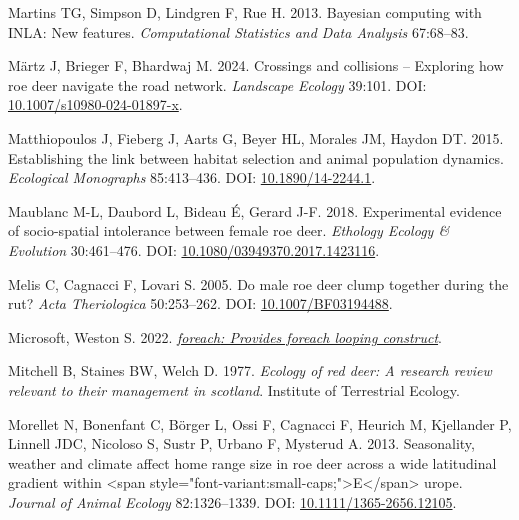 \documentclass[10pt,a4paper]{article}
\newlength{\cslhangindent}
\newenvironment{CSLReferences}[2] %
 {\begin{list}{}{%
  \setlength{\itemindent}{0pt}
  \setlength{\leftmargin}{0pt}
  \setlength{\parsep}{0pt}
  \ifodd #1
   \setlength{\leftmargin}{\cslhangindent}
   \setlength{\itemindent}{-1\cslhangindent}
  \fi
  \setlength{\itemsep}{#2\baselineskip}}}
 {\end{list}}
\begin{document}
\begin{CSLReferences}{1}{0}
Martins TG, Simpson D, Lindgren F, Rue H. 2013. Bayesian computing with {INLA}: {N}ew features. \emph{Computational Statistics and Data Analysis} 67:68--83.

Märtz J, Brieger F, Bhardwaj M. 2024. Crossings and collisions -- {Exploring} how roe deer navigate the road network. \emph{Landscape Ecology} 39:101. DOI: \href{https://doi.org/10.1007/s10980-024-01897-x}{10.1007/s10980-024-01897-x}.

Matthiopoulos J, Fieberg J, Aarts G, Beyer HL, Morales JM, Haydon DT. 2015. Establishing the link between habitat selection and animal population dynamics. \emph{Ecological Monographs} 85:413--436. DOI: \href{https://doi.org/10.1890/14-2244.1}{10.1890/14-2244.1}.

Maublanc M-L, Daubord L, Bideau É, Gerard J-F. 2018. Experimental evidence of socio-spatial intolerance between female roe deer. \emph{Ethology Ecology \& Evolution} 30:461--476. DOI: \href{https://doi.org/10.1080/03949370.2017.1423116}{10.1080/03949370.2017.1423116}.

Melis C, Cagnacci F, Lovari S. 2005. Do male roe deer clump together during the rut? \emph{Acta Theriologica} 50:253--262. DOI: \href{https://doi.org/10.1007/BF03194488}{10.1007/BF03194488}.

Microsoft, Weston S. 2022. \emph{\href{https://CRAN.R-project.org/package=foreach}{{foreach}: Provides foreach looping construct}}.

Mitchell B, Staines BW, Welch D. 1977. \emph{Ecology of red deer: A research review relevant to their management in scotland}. Institute of Terrestrial Ecology.

Morellet N, Bonenfant C, Börger L, Ossi F, Cagnacci F, Heurich M, Kjellander P, Linnell JDC, Nicoloso S, Sustr P, Urbano F, Mysterud A. 2013. Seasonality, weather and climate affect home range size in roe deer across a wide latitudinal gradient within {\textless{}}span style="font-variant:small-caps;"{\textgreater{}}{E}{\textless{}}/span{\textgreater{}} urope. \emph{Journal of Animal Ecology} 82:1326--1339. DOI: \href{https://doi.org/10.1111/1365-2656.12105}{10.1111/1365-2656.12105}.


\end{CSLReferences}
\end{document}
